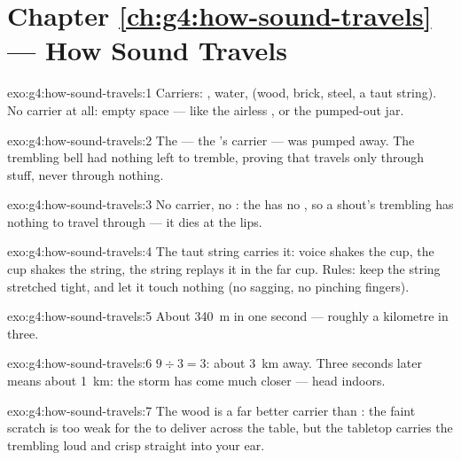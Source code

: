 \section*{Chapter \ref{ch:g4:how-sound-travels} --- How Sound Travels}

\begin{solution}{exo:g4:how-sound-travels:1}
Carriers: , water,  (wood, brick, steel, a taut string).
No carrier at all: empty space --- like the airless , or the
pumped-out jar.
\end{solution}

\begin{solution}{exo:g4:how-sound-travels:2}
The  --- the 's carrier --- was pumped away. The trembling
bell had nothing left to tremble, proving that  travels only
through stuff, never through nothing.
\end{solution}

\begin{solution}{exo:g4:how-sound-travels:3}
No carrier, no : the  has no , so a shout's trembling
has nothing to travel through --- it dies at the lips.
\end{solution}

\begin{solution}{exo:g4:how-sound-travels:4}
The taut string carries it: voice shakes the cup, the cup shakes
the string, the string replays it in the far cup. Rules: keep the
string stretched tight, and let it touch nothing (no sagging, no
pinching fingers).
\end{solution}

\begin{solution}{exo:g4:how-sound-travels:5}
About \qty{340}{m} in one second --- roughly a kilometre in three.
\end{solution}

\begin{solution}{exo:g4:how-sound-travels:6}
$9 \div 3 = 3$: about \qty{3}{km} away. Three seconds later means
about \qty{1}{km}: the storm has come much closer --- head indoors.
\end{solution}

\begin{solution}{exo:g4:how-sound-travels:7}
The wood is a far better carrier than : the faint scratch is too
weak for the  to deliver across the table, but the  tabletop
carries the trembling loud and crisp straight into your ear.
\end{solution}

